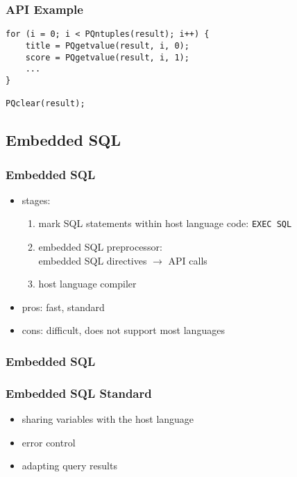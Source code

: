 \documentclass[dvipsnames]{beamer}
\theoremstyle{plain}
\begin{document}
\begin{frame}[fragile]
  \frametitle{API Example}

  \begin{example}
    \begin{lstlisting}
for (i = 0; i < PQntuples(result); i++) {
    title = PQgetvalue(result, i, 0);
    score = PQgetvalue(result, i, 1);
    ...
}

PQclear(result);
    \end{lstlisting}
  \end{example}
\end{frame}

\lstset{language=EmbeddedSQL}

\subsection{Embedded SQL}

\begin{frame}
  \frametitle{Embedded SQL}

  \begin{itemize}
    \item stages:
    \begin{enumerate}
      \item mark SQL statements within host language code: \lstinline!EXEC SQL!
      \item embedded SQL preprocessor:\\
        embedded SQL directives $\rightarrow$ API calls
      \item host language compiler
    \end{enumerate}

    \pause
    \bigskip
    \item pros: fast, standard
    \item cons: difficult, does not support most languages

    \bigskip
    \hyperlink{odbc}{}
  \end{itemize}
\end{frame}

\begin{frame}
  \frametitle{Embedded SQL}

  \begin{center}
  \end{center}
\end{frame}

\begin{frame}
  \frametitle{Embedded SQL Standard}

  \begin{itemize}
    \item sharing variables with the host language
    \item error control
    \item adapting query results
  \end{itemize}
\end{frame}
\end{document}
